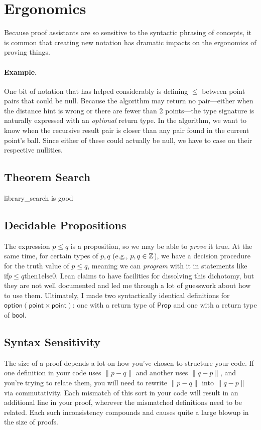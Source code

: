 \documentclass{article}
\begin{document}
\section{Ergonomics}
Because proof assistants are so sensitive to the syntactic phrasing of concepts, it is common that creating new notation has dramatic impacts on the ergonomics of proving things.

\paragraph{Example.}
One bit of notation that has helped considerably is defining $\leq$ between point pairs that could be null.
Because the algorithm may return no pair---either when the distance hint is wrong or there are fewer than 2 points---the type signature is naturally expressed with an \textit{optional} return type.
In the algorithm, we want to know when the recursive result pair is closer than any pair found in the current point's ball.
Since either of these could actually be null, we have to case on their respective nullities.

\subsection{Theorem Search}
library\_search is good

\subsection{Decidable Propositions}
The expression $p \leq q$ is a proposition, so we may be able to \textit{prove} it true.
At the same time, for certain types of $p, q$ (e.g., $p, q \in \mathbb{Z}$), we have a decision procedure for the truth value of $p \leq q$, meaning we can \textit{program} with it in statements like $\text{if} p \leq q \text{then} 1 \text{else} 0$.
Lean claims to have facilities for dissolving this dichotomy, but they are not well documented and led me through a lot of guesswork about how to use them.
Ultimately, I made two syntactically identical definitions for $\mathsf{option} (\mathsf{point} \times \mathsf{point})$: one with a return type of $\mathsf{Prop}$ and one with a return type of $\mathsf{bool}$.

\subsection{Syntax Sensitivity}
The size of a proof depends a lot on how you've chosen to structure your code.
If one definition in your code uses $\| p - q \|$ and another uses $\| q - p \|$, and you're trying to relate them, you will need to rewrite $\| p - q \|$ into $\| q - p \|$ via commutativity.
Each mismatch of this sort in your code will result in an additional line in your proof, wherever the mismatched definitions need to be related.
Each such inconsistency compounds and causes quite a large blowup in the size of proofs.
\end{document}

